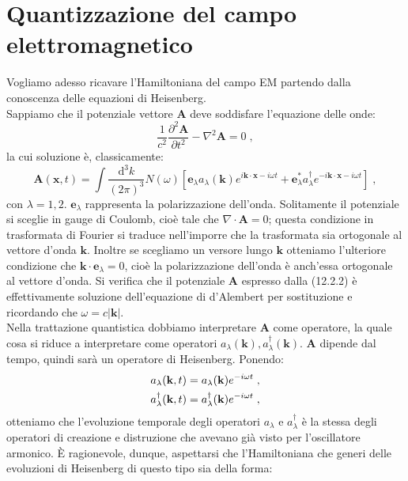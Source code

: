 \documentclass[10pt,a4paper]{report}
\theoremstyle{definition}
\newcommand{\pdev}[3][]{\frac{\partial^{#1} #2}{\partial #3^{#1}}}
\numberwithin{equation}{section}
\newcommand{\diff}[1][]{\mathrm{d}#1}
\newcommand{\adj}[1]{#1^{\dagger}}
\begin{document}
\section{Quantizzazione del campo elettromagnetico}
Vogliamo adesso ricavare l'Hamiltoniana del campo EM partendo dalla conoscenza delle equazioni di Heisenberg. \\
Sappiamo che il potenziale vettore $\mathbf{A}$ deve soddisfare l'equazione delle onde:
\begin{equation}
\frac{1}{c^2}\pdev[2]{\mathbf{A}}{t}-\nabla^2\mathbf{A}=0\;,
\end{equation}
la cui soluzione è, classicamente:
\begin{equation}
\mathbf{A}(\mathbf{x},t)=\int\frac{\diff^3{k}}{(2\pi)^3} N(\omega)\left[\mathbf{e}_{\lambda}a_{\lambda}(\mathbf{k})e^{i\mathbf{k}\cdot\mathbf{x}-i\omega t}+\mathbf{e}^*_{\lambda}\adj{a_{\lambda}}e^{-i\mathbf{k}\cdot\mathbf{x}-i\omega t}\right]\;,
\end{equation}
con $\lambda=1,2$. $\mathbf{e}_{\lambda}$ rappresenta la polarizzazione dell'onda. Solitamente il potenziale si sceglie in gauge di Coulomb, cioè tale che $\nabla\cdot\mathbf{A}=0$; questa condizione in trasformata di Fourier si traduce nell'imporre che la trasformata sia ortogonale al vettore d'onda $\mathbf{k}$. Inoltre se scegliamo un versore lungo $\mathbf{k}$ otteniamo l'ulteriore condizione che $\mathbf{k}\cdot\mathbf{e}_{\lambda}=0$, cioè la polarizzazione dell'onda è anch'essa ortogonale al vettore d'onda. Si verifica che il potenziale $\mathbf{A}$ espresso dalla (12.2.2) è effettivamente soluzione dell'equazione di d'Alembert per sostituzione e ricordando che $\omega=c|\mathbf{k}|$. \\
Nella trattazione quantistica dobbiamo interpretare $\mathbf{A}$ come operatore, la quale cosa si riduce a interpretare come operatori $a_{\lambda}(\mathbf{k}),\adj{a_{\lambda}}(\mathbf{k})$. $\mathbf{A}$ dipende dal tempo, quindi sarà un operatore di Heisenberg. Ponendo:
\begin{align}
a_{\lambda}(\mathbf{k},t)&= a_{\lambda}(\mathbf{k})e^{-i\omega t} \notag\;, \\
\adj{a_{\lambda}}(\mathbf{k},t) &= \adj{a_{\lambda}}(\mathbf{k})e^{-i\omega t}\;,
\end{align}
otteniamo che l'evoluzione temporale degli operatori $a_{\lambda}$ e $\adj{a_{\lambda}}$ è la stessa degli operatori di creazione e distruzione che avevano già visto per l'oscillatore armonico. È ragionevole, dunque, aspettarsi che l'Hamiltoniana che generi delle evoluzioni di Heisenberg di questo tipo sia della forma:
\end{document}
